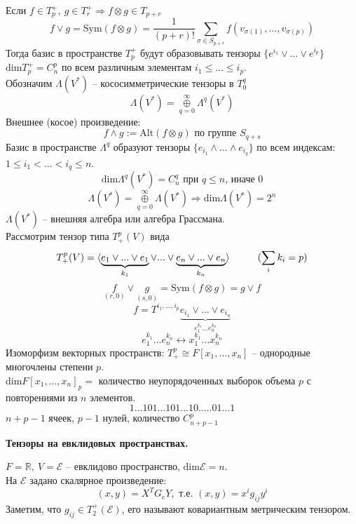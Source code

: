 \documentclass[a4paper, 12pt]{article}
\newcommand\tab[1][.5cm]{\hspace*{#1}}
\theoremstyle{definition}
\begin{document}
    Если $f \in T_p^+,\ g \in T_r^+ \Longrightarrow f \otimes g \in T_{p+r}$ 
    $$f \vee g = \text{Sym}(f\otimes g) = \frac{1}{(p+r)!}\sum\limits_{\sigma \in S_{p+r}} f(v_{\sigma(1)},...,v_{\sigma(p)})$$
    Тогда базис в пространстве $T_p^+$ будут образовывать тензоры $\{e^{i_1}\vee...\vee e^{i_p}\}$\\
    $\text{dim}T_p^+ = C_n^p$ по всем различным элементам $i_1 \leq ... \leq i_p$.\\
    Обозначим $\Lambda(V^*)$ -- кососимметрические тензоры в $T_0^q$
    $$\Lambda(V^*) = \overset{\infty}{\underset{q=0}{\oplus}}\Lambda^q(V^*)$$
    Внешнее (косое) произведение:
    $$f \wedge g := \text{Alt}(f \otimes g) \text{ по группе $S_{q+s}$}$$
    Базис в пространстве $\Lambda^q$ образуют тензоры $\{e_{i_1} \wedge ... \wedge e_{i_q}\}$ по всем индексам: $1 \leq i_1 < ... < i_q \leq n$.
    $$\text{dim}\Lambda^q(V^*) = C_n^q \text{ при $q \leq n$, иначе 0}$$ 
    $$\Lambda(V^*) = \overset{\infty}{\underset{q=0}{\oplus}} \Lambda(V^*) \Longrightarrow \text{dim}\Lambda(V^*) = 2^n$$
    $\Lambda(V^*)$ -- внешняя алгебра или алгебра Грассмана.\\
    Рассмотрим тензор типа $T_+^p(V)$ вида 
    $$T_+^p(V) = \langle \underbrace{e_1 \vee ... \vee e_1}_{k_1} \vee ... \vee \underbrace{e_n \vee ... \vee e_n}_{k_n} \rangle\tab[1cm](\sum\limits_{i} k_i = p)$$
    $$\underset{(r,0)}{f}\vee \underset{(s,0)}{g} = \text{Sym}(f\otimes g) = g \vee f$$
    $$f = T^{i_1,...,i_p}\underbrace{e_{i_1} \vee ... \vee e_{i_n}}_{e_1^{k_1}...e_n^{k_n}} $$
    $$e_1^{k_1}...e_n^{k_n} \longleftrightarrow x_1^{k_1}...x_n^{k_n}$$
    Изоморфизм векторных пространств: $T_+^p \cong F[x_1,...,x_n]$ -- однородные многочлены степени $p$.\\
    dim$F[x_1,...,x_n]_p =$ количество неупорядоченных выборок объема $p$ с повторениями из $n$ элементов.
    $$1...101...101...10.....01...1$$    
    $n+p-1$ ячеек, $p-1$ нулей, количество $C_{n+p-1}^p$
    \begin{center}
        \begin{Large}
            \textbf{Тензоры на евклидовых пространствах.}
        \end{Large}
    \end{center}  
    $F = \mathbb{R},\ V = \mathcal{E}$ -- евклидово пространство, $\text{dim}\mathcal{E} = n$.\\
    На $\mathcal{E}$ задано скалярное произведение:
    $$(x,y) = X^TG_eY, \text{ т.е. } (x,y) = x^ig_{ij}y^i$$  
    Заметим, что $g_{ij} \in T_2^+(\mathcal{E})$, его называют ковариантным метрическим тензором.
\end{document}
